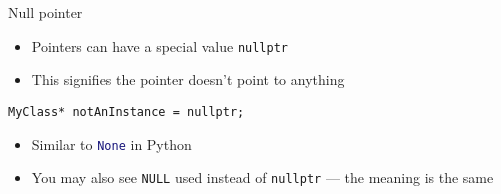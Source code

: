 \begin{frame}[fragile]{Null pointer}
    \begin{itemize}
        \item Pointers can have a special value \lstinline{nullptr} \pause
        \item This signifies the pointer doesn't point to anything \pause
    \end{itemize}
    \begin{lstlisting}
MyClass* notAnInstance = nullptr;
    \end{lstlisting}
    \pause
    \begin{itemize}
        \item Similar to \lstinline[language=Python]{None} in Python \pause
        \item You may also see \lstinline{NULL} used instead of \lstinline{nullptr} ---
            the meaning is the same
    \end{itemize}
\end{frame}


%
